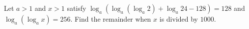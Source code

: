Let $a > 1$ and $x > 1$ satisfy $\log_a(\log_a(\log_a 2) + \log_a 24 - 128) = 128$ and $\log_a(\log_a x) = 256$. Find the remainder when $x$ is divided by $1000$.